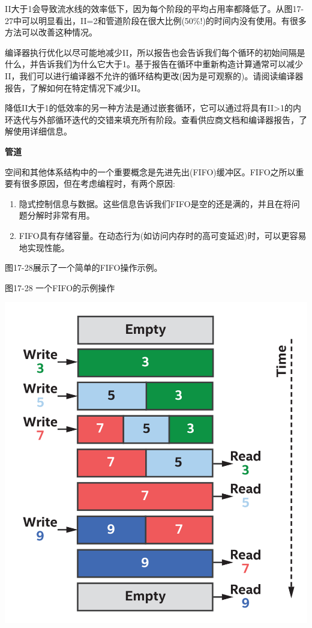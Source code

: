 II大于1会导致流水线的效率低下，因为每个阶段的平均占用率都降低了。从图17-27中可以明显看出，II=2和管道阶段在很大比例(50\%!)的时间内没有使用。有很多方法可以改善这种情况。\par

编译器执行优化以尽可能地减少II，所以报告也会告诉我们每个循环的初始间隔是什么，并告诉我们为什么它大于1。基于报告在循环中重新构造计算通常可以减少II，我们可以进行编译器不允许的循环结构更改(因为是可观察的)。请阅读编译器报告，了解如何在特定情况下减少II。\par

降低II大于1的低效率的另一种方法是通过嵌套循环，它可以通过将具有II>1的内环迭代与外部循环迭代的交错来填充所有阶段。查看供应商文档和编译器报告，了解使用详细信息。\par

\hspace*{\fill} \par %
\textbf{管道}

空间和其他体系结构中的一个重要概念是先进先出(FIFO)缓冲区。FIFO之所以重要有很多原因，但在考虑编程时，有两个原因:\par

\begin{enumerate}
	\item 隐式控制信息与数据。这些信息告诉我们FIFO是空的还是满的，并且在将问题分解时非常有用。
	\item FIFO具有存储容量。在动态行为(如访问内存时的高可变延迟)时，可以更容易地实现性能。
\end{enumerate}

图17-28展示了一个简单的FIFO操作示例。\par

\hspace*{\fill} \par %
图17-28 一个FIFO的示例操作
\begin{center}
	\includegraphics[width=1.0\textwidth]{content/chapter-17/images/23}
\end{center}

